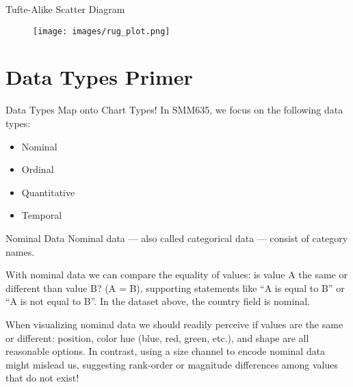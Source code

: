 \documentclass[aspectratio=1610]{beamer}
\begin{document}
\begin{frame}{Tufte-Alike Scatter Diagram}{}
	\begin{figure}
		\begin{center}
			\texttt{[image: images/rug\_plot.png]}
		\end{center}
	\end{figure}

\end{frame}

\section{Data Types Primer}

\begin{frame}{Data Types Map onto Chart Types!}{}
	In SMM635, we focus on the following data types:
	\begin{itemize}
		\item Nominal
		\item Ordinal
		\item Quantitative
		\item Temporal
	\end{itemize}
\end{frame}

\begin{frame}{Nominal Data}
	\small
	Nominal data — also called categorical data — consist of category names.

	\vspace{1em}

	With nominal data we can compare the equality of values: is value A the same or different than value B? (A = B), supporting statements like “A is equal to B” or “A is not equal to B”. In the dataset above, the country field is nominal.

	\vspace{1em}

	When visualizing nominal data we should readily perceive if values are
	the same or different: position, color hue (blue, red, green, etc.), and
	shape are all reasonable options. In contrast, using a size channel to
	encode nominal data might mislead us, suggesting rank-order or magnitude
	differences among values that do not exist!
\end{frame}
\end{document}
